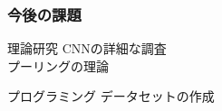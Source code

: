 \documentclass[dvipdfmx,11pt,notheorems]{beamer}
\theoremstyle{definition}
\newtheorem{theorem}{定理}
\begin{document}
\begin{frame}\frametitle{今後の課題}

\begin{block}{理論研究}
CNNの詳細な調査\\
プーリングの理論
\end{block}

\vspace{1cm}
\begin{exampleblock}{プログラミング}
データセットの作成
\end{exampleblock}
\end{frame}




\end{document}
